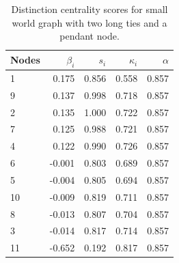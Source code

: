 \begin{table}
\centering
\caption{\label{tab:rege2}Distinction centrality scores for small world graph with two long ties and a pendant node.}
\centering
\begin{tabular}[t]{lrrrr}
\toprule
Nodes & $\beta_i$ & $s_i$ & $\kappa_i$ & $\alpha$\\
\midrule
1 & 0.175 & 0.856 & 0.558 & 0.857\\
9 & 0.137 & 0.998 & 0.718 & 0.857\\
2 & 0.135 & 1.000 & 0.722 & 0.857\\
7 & 0.125 & 0.988 & 0.721 & 0.857\\
4 & 0.122 & 0.990 & 0.726 & 0.857\\
6 & -0.001 & 0.803 & 0.689 & 0.857\\
5 & -0.004 & 0.805 & 0.694 & 0.857\\
10 & -0.009 & 0.819 & 0.711 & 0.857\\
8 & -0.013 & 0.807 & 0.704 & 0.857\\
3 & -0.014 & 0.817 & 0.714 & 0.857\\
11 & -0.652 & 0.192 & 0.817 & 0.857\\
\bottomrule
\end{tabular}
\end{table}

